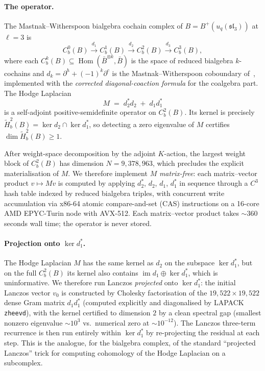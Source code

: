 \paragraph{The operator.}
The Mastnak--Witherspoon bialgebra cochain complex of $B = B^+(u_q(\mathfrak{sl}_3))$ at $\ell = 3$ is
\[
C^0_b(B) \xrightarrow{d_1} C^1_b(B) \xrightarrow{d_2} C^2_b(B) \xrightarrow{d_3} C^3_b(B),
\]
where each $C^k_b(B) \subseteq \operatorname{Hom}(\bar B^{\otimes k}, \bar B)$ is the space of reduced bialgebra $k$-cochains and $d_k = \partial^h + (-1)^k \partial^c$ is the Mastnak--Witherspoon coboundary of~\cite[\S 2.1]{MW08}, implemented with the \emph{corrected diagonal-coaction formula} for the coalgebra part. The Hodge Laplacian
\[
M \;=\; d_2^* d_2 \;+\; d_1 d_1^*
\]
is a self-adjoint positive-semidefinite operator on $C^2_b(B)$. Its kernel is precisely $\tilde{H}^2_b(B) = \ker d_2 \cap \ker d_1^*$, so detecting a zero eigenvalue of $M$ certifies $\dim \tilde{H}^2_b(B) \geq 1$.

After weight-space decomposition by the adjoint $K$-action, the largest weight block of $C^2_b(B)$ has dimension $N = 9{,}378{,}963$, which precludes the explicit materialisation of $M$. We therefore implement $M$ \emph{matrix-free}: each matrix--vector product $v \mapsto Mv$ is computed by applying $d_2^*$, $d_2$, $d_1$, $d_1^*$ in sequence through a $C^3$ hash table indexed by reduced bialgebra triples, with concurrent write accumulation via x86-64 atomic compare-and-set (CAS) instructions on a 16-core AMD EPYC-Turin node with AVX-512. Each matrix--vector product takes $\sim 360$ seconds wall time; the operator is never stored.

\paragraph{Projection onto $\ker d_1^*$.}
The Hodge Laplacian $M$ has the same kernel as $d_2$ on the subspace $\ker d_1^*$, but on the full $C^2_b(B)$ its kernel also contains $\operatorname{im} d_1 \oplus \ker d_1^*$, which is uninformative. We therefore run Lanczos \emph{projected} onto $\ker d_1^*$: the initial Lanczos vector $v_0$ is constructed by Cholesky factorisation of the $19{,}522 \times 19{,}522$ dense Gram matrix $d_1 d_1^*$ (computed explicitly and diagonalised by LAPACK \texttt{zheevd}), with the kernel certified to dimension $2$ by a clean spectral gap (smallest nonzero eigenvalue $\sim 10^3$ vs.\ numerical zero at $\sim 10^{-12}$). The Lanczos three-term recurrence is then run entirely within $\ker d_1^*$ by re-projecting the residual at each step. This is the analogue, for the bialgebra complex, of the standard ``projected Lanczos'' trick for computing cohomology of the Hodge Laplacian on a subcomplex.

